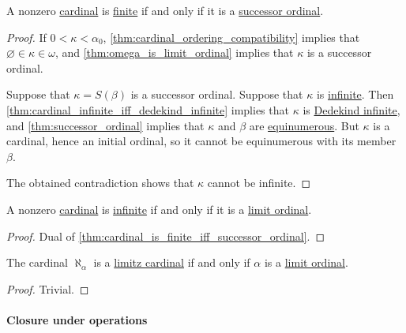 \begin{proposition}\label{thm:cardinal_is_finite_iff_successor_ordinal}
  A nonzero \hyperref[def:cardinal]{cardinal} is \hyperref[def:aleph_zero_related_cardinalities]{finite} if and only if it is a \hyperref[def:successor_and_limit_ordinal]{successor ordinal}.
\end{proposition}
\begin{proof}
  \SufficiencySubProof If \( 0 < \kappa < \alpha_0 \), \cref{thm:cardinal_ordering_compatibility} implies that \( \varnothing \in \kappa \in \omega \), and \cref{thm:omega_is_limit_ordinal} implies that \( \kappa \) is a successor ordinal.

  \NecessitySubProof Suppose that \( \kappa = S(\beta) \) is a successor ordinal. Suppose that \( \kappa \) is \hyperref[def:aleph_zero_related_cardinalities]{infinite}. Then \cref{thm:cardinal_infinite_iff_dedekind_infinite} implies that \( \kappa \) is \hyperref[def:dedekind_finiteness]{Dedekind infinite}, and \cref{thm:successor_ordinal} implies that \( \kappa \) and \( \beta \) are \hyperref[def:equinumerosity]{equinumerous}. But \( \kappa \) is a cardinal, hence an initial ordinal, so it cannot be equinumerous with its member \( \beta \).

  The obtained contradiction shows that \( \kappa \) cannot be infinite.
\end{proof}

\begin{corollary}\label{thm:cardinal_is_infinite_iff_limit_ordinal}
  A nonzero \hyperref[def:cardinal]{cardinal} is \hyperref[def:aleph_zero_related_cardinalities]{infinite} if and only if it is a \hyperref[def:successor_and_limit_ordinal]{limit ordinal}.
\end{corollary}
\begin{proof}
  Dual of \cref{thm:cardinal_is_finite_iff_successor_ordinal}.
\end{proof}

\begin{proposition}\label{thm:limit_cardinal_equivalences}
  The cardinal \( \aleph_\alpha \) is a \hyperref[def:successor_and_limit_cardinal]{limitz cardinal} if and only if \( \alpha \) is a \hyperref[def:successor_and_limit_ordinal]{limit ordinal}.
\end{proposition}
\begin{proof}
  Trivial.
\end{proof}

\paragraph{Closure under operations}

